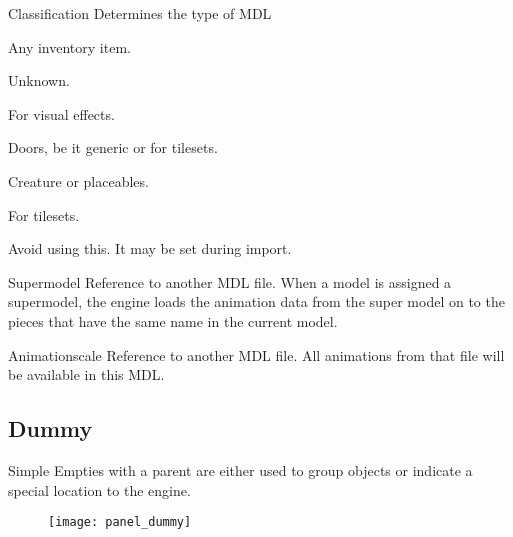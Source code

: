 \begin{propertyAurora}{Classification}
Determines the type of MDL
\begin{description}[leftmargin=6em,style=nextline]
    \item[Item] Any inventory item.
    \item[GUI] Unknown.
    \item[Effect] For visual effects.
    \item[Door] Doors, be it generic or for tilesets.
    \item[Character] Creature or placeables. 
    \item[Tile] For tilesets.
    \item[Unknown] Avoid using this. It may be set during import.
\end{description}
\end{propertyAurora}

\begin{propertyAurora}{Supermodel}
Reference to another MDL file. When a model is assigned a supermodel, 
the engine loads the animation data from the super model on to the 
pieces that have the same name in the current model.
\end{propertyAurora}

\begin{propertyAurora}{Animationscale}
Reference to another MDL file. All animations from that file 
will be available in this MDL.
\end{propertyAurora}

\subsection{Dummy}
Simple Empties with a parent are either used to group objects or
indicate a special location to the engine. \\

\begin{figure}
  \centering
  \texttt{[image: panel\_dummy]}
  \label{fig:panel_dummy}
\end{figure}

